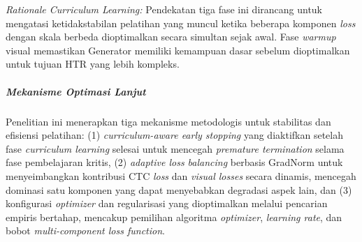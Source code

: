 \documentclass[12pt,a4paper]{article}
\begin{document}
\textit{Rationale Curriculum Learning:} Pendekatan tiga fase ini dirancang untuk mengatasi ketidakstabilan pelatihan yang muncul ketika beberapa komponen \textit{loss} dengan skala berbeda dioptimalkan secara simultan sejak awal. Fase \textit{warmup} visual memastikan Generator memiliki kemampuan dasar sebelum dioptimalkan untuk tujuan HTR yang lebih kompleks.

\subparagraph{Mekanisme Optimasi Lanjut}
Penelitian ini menerapkan tiga mekanisme metodologis untuk stabilitas dan efisiensi pelatihan: (1) \textit{curriculum-aware early stopping} yang diaktifkan setelah fase \textit{curriculum learning} selesai untuk mencegah \textit{premature termination} selama fase pembelajaran kritis, (2) \textit{adaptive loss balancing} berbasis GradNorm untuk menyeimbangkan kontribusi CTC \textit{loss} dan \textit{visual losses} secara dinamis, mencegah dominasi satu komponen yang dapat menyebabkan degradasi aspek lain, dan (3) konfigurasi \textit{optimizer} dan regularisasi yang dioptimalkan melalui pencarian empiris bertahap, mencakup pemilihan algoritma \textit{optimizer}, \textit{learning rate}, dan bobot \textit{multi-component loss function}.
\end{document}

